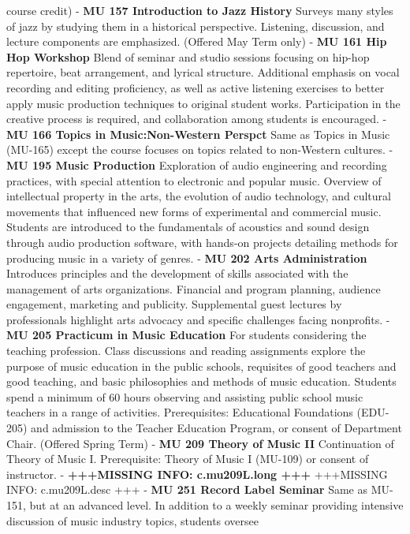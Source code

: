 \documentclass[
  letterpaper,
]{scrbook}
\begin{document}
course credit) - \textbf{MU 157 Introduction to Jazz History} Surveys
many styles of jazz by studying them in a historical perspective.
Listening, discussion, and lecture components are emphasized. (Offered
May Term only) - \textbf{MU 161 Hip Hop Workshop} Blend of seminar and
studio sessions focusing on hip-hop repertoire, beat arrangement, and
lyrical structure. Additional emphasis on vocal recording and editing
proficiency, as well as active listening exercises to better apply music
production techniques to original student works. Participation in the
creative process is required, and collaboration among students is
encouraged. - \textbf{MU 166 Topics in Music:Non-Western Perspct} Same
as Topics in Music (MU-165) except the course focuses on topics related
to non-Western cultures. - \textbf{MU 195 Music Production} Exploration
of audio engineering and recording practices, with special attention to
electronic and popular music. Overview of intellectual property in the
arts, the evolution of audio technology, and cultural movements that
influenced new forms of experimental and commercial music. Students are
introduced to the fundamentals of acoustics and sound design through
audio production software, with hands-on projects detailing methods for
producing music in a variety of genres. - \textbf{MU 202 Arts
Administration} Introduces principles and the development of skills
associated with the management of arts organizations. Financial and
program planning, audience engagement, marketing and publicity.
Supplemental guest lectures by professionals highlight arts advocacy and
specific challenges facing nonprofits. - \textbf{MU 205 Practicum in
Music Education} For students considering the teaching profession. Class
discussions and reading assignments explore the purpose of music
education in the public schools, requisites of good teachers and good
teaching, and basic philosophies and methods of music education.
Students spend a minimum of 60 hours observing and assisting public
school music teachers in a range of activities. Prerequisites:
Educational Foundations (EDU-205) and admission to the Teacher Education
Program, or consent of Department Chair. (Offered Spring Term) -
\textbf{MU 209 Theory of Music II} Continuation of Theory of Music I.
Prerequisite: Theory of Music I (MU-109) or consent of instructor. -
\textbf{+++MISSING INFO: c.mu209L.long +++} +++MISSING INFO:
c.mu209L.desc +++ - \textbf{MU 251 Record Label Seminar} Same as MU-151,
but at an advanced level. In addition to a weekly seminar providing
intensive discussion of music industry topics, students oversee
\end{document}
